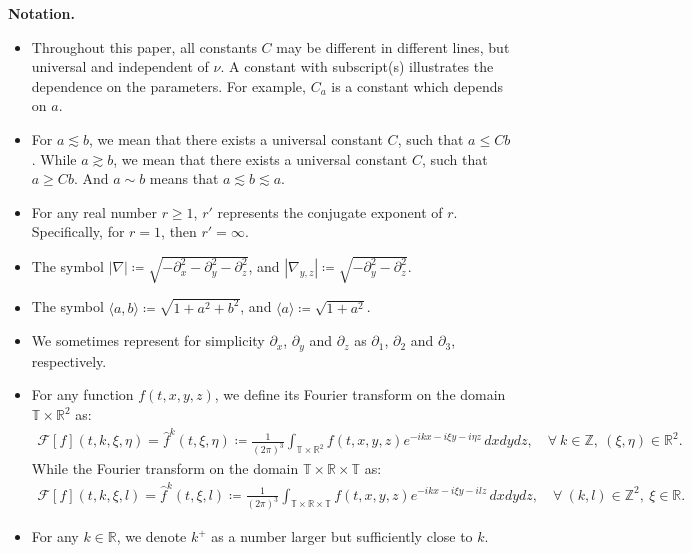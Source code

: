 \documentclass[11pt,reqno]{article}
\numberwithin{equation}{section}
\newcommand\R{{\mathbb R}}
\newcommand\T{{\mathbb T}}
\newcommand\Z{{\mathbb Z}}
\newcommand\F{{\mathcal F}}
\newcommand \tri {\coloneqq}
\let\pa=\partial
\let\f=\frac
\begin{document}
\noindent\textbf{Notation.}
\begin{itemize}
\item[(1)] Throughout this paper, all constants $C$ may be different in different lines, but universal and independent of $\nu$. 
A constant with subscript(s) illustrates the dependence on the parameters. For example, $C_{a}$ is a constant which depends on $a$. 
\item[(2)]For $a\lesssim b$, we mean that there exists a universal constant $C$, such that $a\leq Cb$. While $a\gtrsim b$, we mean that there exists a universal constant $C$, such that $a\geq Cb$. And $a\sim b$ means that $a\lesssim b\lesssim a$. 
\item[(3)]  For any real number $r\geq1$, $r'$ represents the conjugate exponent of $r$. Specifically, for $r=1$, then $r'=\infty$.
\item[(4)]  The symbol $|\nabla|\tri \sqrt{-\pa_x^2-\pa_y^2-\pa_z^2}$, and $|\nabla_{y,z}|\tri \sqrt{-\pa_y^2-\pa_z^2}$.

\item[(5)] The symbol $\langle a, b\rangle \tri \sqrt{1+a^2+b^2}$, and $\langle a\rangle\tri \sqrt{1+a^2}$.

\item[(6)]  We sometimes represent for simplicity $\pa_x$, $\pa_y$ and $\pa_z$ as $\pa_1$, $\pa_2$ and $\pa_3$, respectively.

\item[(7)]  
For any function $f(t,x,y,z)$, we define its Fourier transform on the domain $\T\times\R^2$ as:
\begin{align*}
\F[f](t,k,\xi,\eta)=\hat{f}^k(t,\xi,\eta)
\tri \f{1}{(2\pi)^3} \int_{\T\times\R^2} f(t,x,y,z)e^{-ikx-i\xi y-i\eta z}\,dx dy dz,\quad \forall ~k\in\Z,~(\xi,\eta)\in\R^2.
\end{align*} 
While the Fourier transform on the domain $\T\times\R\times\T$ as:
\begin{align*}
\F[f](t,k,\xi,l)=\hat{f}^k(t,\xi,l)
\tri \f{1}{(2\pi)^3} \int_{\T\times\R\times\T} f(t,x,y,z)e^{-ikx-i\xi y-il z}\,dx dy dz,\quad \forall ~(k,l)\in\Z^2,~\xi\in\R.
\end{align*} 

\item[(8)] For any $k\in\R$, we denote $k^{+}$ as a number larger but sufficiently close to $k.$

\end{itemize}
\end{document}
